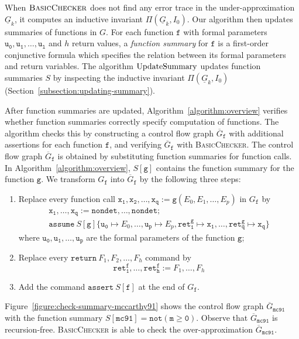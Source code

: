 When $\textsc{BasicChecker}$ does not find any error trace in the
under-approximation $\underline{G}_k$, it computes an inductive
invariant $\Pi (\underline{G}_k, I_0)$. Our algorithm then updates
summaries of functions in $G$. For each function $\mathtt{f}$ with
formal parameters $\mathtt{u_0}, \mathtt{u_1}, \ldots, \mathtt{u_l}$
and $h$ return values, a \emph{function summary} for $\mathtt{f}$ is a
first-order conjunctive formula which specifies the relation between
its formal parameters and return variables. The algorithm
$\textmd{UpdateSummary}$ updates function summaries $S$ by inspecting
the inductive invariant $\Pi (\underline{G}_k, I_0)$
(Section~\ref{subsection:updating-summary}). 

After function summaries are updated, Algorithm~\ref{algorithm:overview} 
verifies whether function summaries correctly specify computation of
functions. The algorithm checks this by constructing a control flow
graph $\overline{G}_{\mathtt{f}}$ with additional assertions for each
function $\mathtt{f}$, and verifying $\overline{G}_{\mathtt{f}}$ with
\textsc{BasicChecker}. The control flow graph
$\overline{G}_{\mathtt{f}}$ is obtained by substituting function
summaries for function calls. In Algorithm~\ref{algorithm:overview},
$S[\mathtt{g}]$ contains the function summary for the function
$\mathtt{g}$.  
We transform $G_{\mathtt{f}}$ into $\overline{G}_{\mathtt{f}}$ by the
following three steps:
\begin{enumerate}
\item Replace every function call $\mathtt{x_1}, \mathtt{x_2}, \ldots,
  \mathtt{x_q} := \mathtt{g} (E_0, E_1, \ldots, E_p)$ in $G_{\mathtt{f}}$ by 
  \begin{equation*}
    \begin{array}{l}
      \mathtt{x_1}, \ldots, \mathtt{x_q} :=
      \mathtt{nondet}, \ldots, \mathtt{nondet};\\
      \mathtt{assume}\ 
      S[{\mathtt{g}}]\{\mathtt{u_0} \mapsto E_0, \ldots, 
      \mathtt{u_p} \mapsto E_p, \mathtt{ret^g_1} \mapsto \mathtt{x_1},
      \ldots, \mathtt{ret^g_q} \mapsto \mathtt{x_q}\}
    \end{array}
  \end{equation*}
  where $\mathtt{u_0}, \mathtt{u_1}, \ldots, \mathtt{u_p}$
  are the formal parameters of the function $\mathtt{g}$;
\item Replace every $\mathtt{return\ }F_1, F_2, \ldots, F_h$ command by
  \begin{equation*}
    \mathtt{ret^f_1}, \ldots, \mathtt{ret^f_h} := F_1, \ldots, F_h
  \end{equation*}
\item Add the command $\mathtt{assert\ }S[{\mathtt{f}}]$ at the end of
  $G_{\mathtt{f}}$. 
\end{enumerate}
Figure~\ref{figure:check-summary-mccarthy91} shows the control flow
graph $\overline{G}_{\mathtt{mc91}}$ with the function summary
$S[{\mathtt{mc91}}] = \mathtt{not (m \geq 0)}$. Observe that
$\overline{G}_{\mathtt{mc91}}$ is
recursion-free. \textsc{BasicChecker} is able to check the
over-approximation $\overline{G}_{\mathtt{mc91}}$. 


